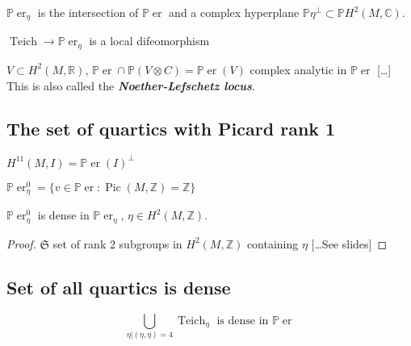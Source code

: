 \begin{remark}\leavevmode
	$\mathbb{P}\operatorname{er}_\eta$ is the intersection of $\mathbb{P}\operatorname{er}$ and a complex hyperplane $\mathbb{P}\eta^\perp \subset\mathbb{P}H^{2}(M,\mathbb{C})$.
\end{remark}

\begin{claim}\leavevmode
	$\operatorname{Teich}\longrightarrow \mathbb{P}\operatorname{er}_\eta$ is a local difeomorphism
\end{claim}

\begin{defn}\leavevmode
	$V \subset H^{2}(M,\mathbb{R})$, $\mathbb{P}\operatorname{er}\cap \mathbb{P}(V\otimes C)=\mathbb{P}\operatorname{er}(V)$ complex analytic in $\mathbb{P}\operatorname{er}$ […] This is also called the \textit{\textbf{Noether-Lefschetz locus}}.
\end{defn}

\subsection{The set of quartics with Picard rank 1}

\begin{remark}\leavevmode
	$H^{11}(M,I)=\mathbb{P}\operatorname{er}(I)^\perp$
\end{remark}

\begin{defn}\leavevmode
	$\mathbb{P}\operatorname{er}^0_\eta=\{v\in\mathbb{P}\operatorname{er}:\operatorname{Pic}(M,\mathbb{Z}) =\mathbb{Z}\}$
\end{defn}

\begin{claim}\leavevmode
$\mathbb{P}\operatorname{er}^0_\eta$ is dense in $\mathbb{P}\operatorname{er}_\eta$, $\eta\in H^{2}(M,\mathbb{Z})$.
\end{claim}

\begin{proof}\leavevmode
	$\mathfrak{S}$ set of rank 2 subgroups in $H^{2}(M,\mathbb{Z})$ containing $\eta$ […See slides]
\end{proof}

\subsection{Set of all quartics is dense}

\begin{thm}\leavevmode
	\[\bigcup_{\eta|(\eta,\eta)=4} \operatorname{Teich}_\eta\text{ is dense in $\mathbb{P}\operatorname{er}$} \]
\end{thm}

